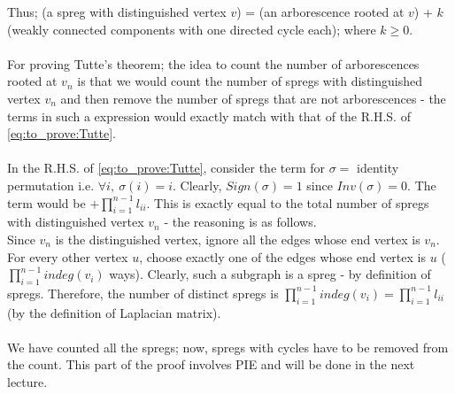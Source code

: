 \noindent Thus; (a spreg  with distinguished vertex $v$) = (an arborescence rooted at $v$) + $k$ (weakly connected components with one directed cycle each); where $k \geq 0$. \\
\noindent\\
For proving Tutte's theorem; the idea to count the number of arborescences rooted at $v_n$ is that we would count the number of spregs with distinguished vertex $v_n$ and then remove the number of spregs that are not arborescences - the terms in such a expression would exactly match with that of the R.H.S. of \ref{eq:to_prove:Tutte}.\\
\noindent\\
In the R.H.S. of \ref{eq:to_prove:Tutte}, consider the term for $\sigma =$ identity permutation i.e. $\forall i,~ \sigma(i)=i$. Clearly, $Sign(\sigma)=1$ since $Inv(\sigma)=0$. The term would be $+ \prod_{i=1}^{n-1}l_{ii}$. This is exactly equal to the total number of spregs with distinguished vertex $v_n$ - the reasoning is as follows.\\
Since $v_n$ is the distinguished vertex, ignore all the edges whose end vertex is $v_n$. For every other vertex $u$, choose exactly one of the edges whose end vertex is $u$ ($\prod_{i=1}^{n-1}indeg(v_i)$ ways). Clearly, such a subgraph is a spreg - by definition of spregs. Therefore, the number of distinct spregs is $\prod_{i=1}^{n-1}indeg(v_i) = \prod_{i=1}^{n-1}l_{ii}$ (by the definition of Laplacian matrix). \\
\noindent\\
We have counted all the spregs; now, spregs with cycles have to be removed from the count. This part of the proof involves PIE and will be done in the next lecture.

